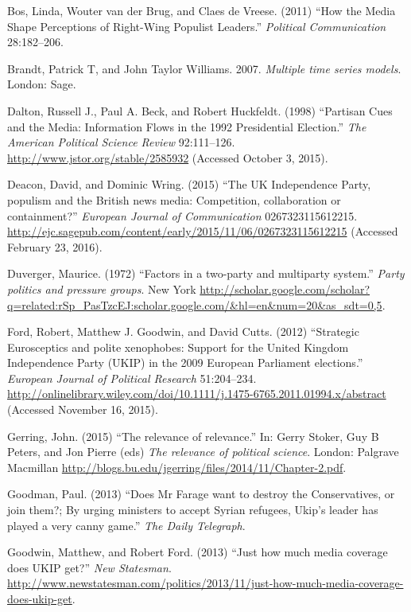 \documentclass[12pt,article]{article}
\begin{document}
\hypertarget{ref-Bos:2011iy}{}
Bos, Linda, Wouter van der Brug, and Claes de Vreese. (2011) ``How the
Media Shape Perceptions of Right-Wing Populist Leaders.''
\emph{Political Communication} 28:182--206.

\hypertarget{ref-brandt2007multiple}{}
Brandt, Patrick T, and John Taylor Williams. 2007. \emph{Multiple time
series models}. London: Sage.

\hypertarget{ref-daltonux5fpartisanux5f1998}{}
Dalton, Russell J., Paul A. Beck, and Robert Huckfeldt. (1998)
``Partisan Cues and the Media: Information Flows in the 1992
Presidential Election.'' \emph{The American Political Science Review}
92:111--126. \url{http://www.jstor.org/stable/2585932} (Accessed October
3, 2015).

\hypertarget{ref-deaconux5fukux5f2015}{}
Deacon, David, and Dominic Wring. (2015) ``The UK Independence Party,
populism and the British news media: Competition, collaboration or
containment?'' \emph{European Journal of Communication}
0267323115612215.
\url{http://ejc.sagepub.com/content/early/2015/11/06/0267323115612215}
(Accessed February 23, 2016).

\hypertarget{ref-Duverger:1972wk}{}
Duverger, Maurice. (1972) ``Factors in a two-party and multiparty
system.'' \emph{Party politics and pressure groups}. New York
\url{http://scholar.google.com/scholar?q=related:rSp_PasTzcEJ:scholar.google.com/\&hl=en\&num=20\&as_sdt=0,5}.

\hypertarget{ref-fordux5fstrategicux5f2012}{}
Ford, Robert, Matthew J. Goodwin, and David Cutts. (2012) ``Strategic
Eurosceptics and polite xenophobes: Support for the United Kingdom
Independence Party (UKIP) in the 2009 European Parliament elections.''
\emph{European Journal of Political Research} 51:204--234.
\url{http://onlinelibrary.wiley.com/doi/10.1111/j.1475-6765.2011.01994.x/abstract}
(Accessed November 16, 2015).

\hypertarget{ref-Gerring:2015ub}{}
Gerring, John. (2015) ``The relevance of relevance.'' In: Gerry Stoker,
Guy B Peters, and Jon Pierre (eds) \emph{The relevance of political
science}. London: Palgrave Macmillan
\url{http://blogs.bu.edu/jgerring/files/2014/11/Chapter-2.pdf}.

\hypertarget{ref-goodmanux5fdoesux5f2013}{}
Goodman, Paul. (2013) ``Does Mr Farage want to destroy the
Conservatives, or join them?; By urging ministers to accept Syrian
refugees, Ukip's leader has played a very canny game.'' \emph{The Daily
Telegraph}.

\hypertarget{ref-Goodwin:03LtHfhh}{}
Goodwin, Matthew, and Robert Ford. (2013) ``Just how much media coverage
does UKIP get?'' \emph{New Statesman}.
\url{http://www.newstatesman.com/politics/2013/11/just-how-much-media-coverage-does-ukip-get}.
\end{document}
